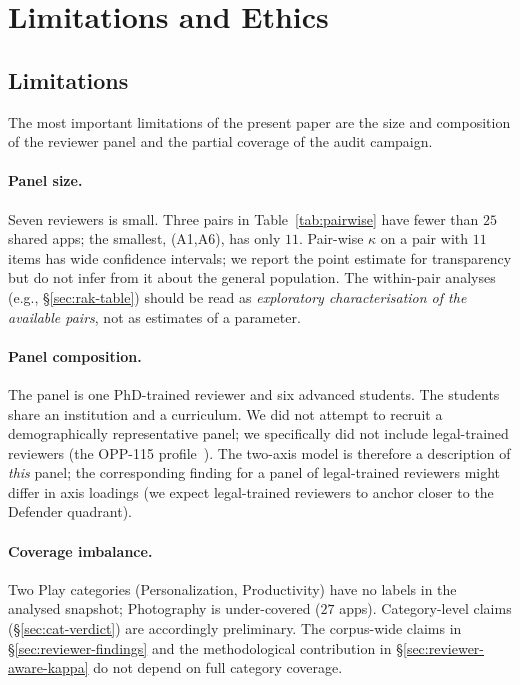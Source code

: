 \documentclass[11pt,a4paper]{article}
\newcommand{\Acc}[1]{\textsf{A#1}}
\begin{document}
\section{Limitations and Ethics}
\label{sec:limits}

\subsection{Limitations}
\label{sec:limitations}

The most important limitations of the present paper are the size and
composition of the reviewer panel and the partial coverage of the
audit campaign.

\paragraph{Panel size.}
Seven reviewers is small. Three pairs in Table~\ref{tab:pairwise}
have fewer than $25$ shared apps; the smallest, (\Acc{1},\Acc{6}),
has only $11$. Pair-wise $\kappa$ on a pair with $11$ items has wide
confidence intervals; we report the point estimate for transparency
but do not infer from it about the general population. The
within-pair analyses (e.g., \S\ref{sec:rak-table}) should be read
as \emph{exploratory characterisation of the available pairs}, not as
estimates of a parameter.

\paragraph{Panel composition.}
The panel is one PhD-trained reviewer and six advanced students.
The students share an institution and a curriculum. We did not
attempt to recruit a demographically representative panel; we
specifically did not include legal-trained reviewers (the OPP-115
profile~\citealp{wilson2016creation}). The two-axis model is therefore
a description of \emph{this} panel; the corresponding finding for a
panel of legal-trained reviewers might differ in axis loadings (we
expect legal-trained reviewers to anchor closer to the Defender
quadrant).

\paragraph{Coverage imbalance.}
Two Play categories (Personalization, Productivity) have no labels
in the analysed snapshot; Photography is under-covered ($27$ apps).
Category-level claims (\S\ref{sec:cat-verdict}) are accordingly
preliminary. The corpus-wide claims in \S\ref{sec:reviewer-findings}
and the methodological contribution in
\S\ref{sec:reviewer-aware-kappa} do not depend on full category
coverage.
\end{document}
